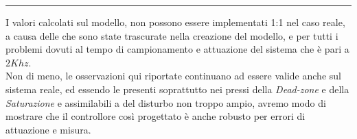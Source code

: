 \begin{center}
	\rule{0.5\linewidth}{0.5px}
\end{center}
\noindent
I valori calcolati sul modello, non possono essere implementati 1:1 nel caso reale, a causa delle \nonLinearita che sono state trascurate nella creazione del modello, e per tutti i problemi dovuti al tempo di campionamento e attuazione del sistema che è pari a $ 2Khz $.\\
Non di meno, le osservazioni qui riportate continuano ad essere valide anche sul sistema reale, ed essendo le \nonLinearita presenti soprattutto nei pressi della \textit{Dead-zone} e della \textit{Saturazione} e assimilabili a del disturbo non troppo ampio, avremo modo di mostrare che il controllore così progettato è anche robusto per errori di attuazione e misura.



